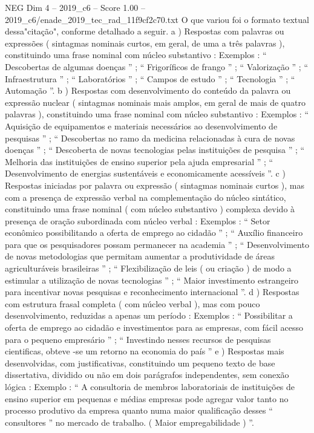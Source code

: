 \begin{textsample}{NEG Dim 4 – 2019\_c6 – Score 1.00 – 2019\_c6/enade\_2019\_tec\_rad\_11f9cf2c70.txt}
O que variou foi o formato textual dessa"citação", conforme detalhado a seguir. a ) Respostas com palavras ou expressões ( sintagmas nominais curtos, em geral, de uma a três palavras ), constituindo uma frase nominal com núcleo substantivo : Exemplos : “ Descobertas de algumas doenças ” ; “ Frigoríficos de frango ” ; “ Valorização ” ; “ Infraestrutura ” ; “ Laboratórios ” ; “ Campos de estudo ” ; “ Tecnologia ” ; “ Automação ”. b ) Respostas com desenvolvimento do conteúdo da palavra ou expressão nuclear ( sintagmas nominais mais amplos, em geral de mais de quatro palavras ), constituindo uma frase nominal com núcleo substantivo : Exemplos : “ Aquisição de equipamentos e materiais necessários ao desenvolvimento de pesquisas ” ; “ Descobertas no ramo da medicina relacionadas à cura de novas doenças ” ; “ Descoberta de novas tecnologias pelas instituições de pesquisa ” ; “ Melhoria das instituições de ensino superior pela ajuda empresarial ” ; “ Desenvolvimento de energias sustentáveis e economicamente acessíveis ”. c ) Respostas iniciadas por palavra ou expressão ( sintagmas nominais curtos ), mas com a presença de expressão verbal na complementação do núcleo sintático, constituindo uma frase nominal ( com núcleo substantivo ) complexa devido à presença de oração subordinada com núcleo verbal : Exemplos : “ Setor econômico possibilitando a oferta de emprego ao cidadão ” ; “ Auxílio financeiro para que os pesquisadores possam permanecer na academia ” ; “ Desenvolvimento de novas metodologias que permitam aumentar a produtividade de áreas agriculturáveis brasileiras ” ; “ Flexibilização de leis ( ou criação ) de modo a estimular a utilização de novas tecnologias ” ; “ Maior investimento estrangeiro para incentivar novas pesquisas e reconhecimento internacional ”. d ) Respostas com estrutura frasal completa ( com núcleo verbal ), mas com pouco desenvolvimento, reduzidas a apenas um período : Exemplos : “ Possibilitar a oferta de emprego ao cidadão e investimentos para as empresas, com fácil acesso para o pequeno empresário ” ; “ Investindo nesses recursos de pesquisas cientificas, obteve -se um retorno na economia do país ” e ) Respostas mais desenvolvidas, com justificativas, constituindo um pequeno texto de base dissertativa, dividido ou não em dois parágrafos independentes, sem conexão lógica : Exemplo : “ A consultoria de membros laboratoriais de instituições de ensino superior em pequenas e médias empresas pode agregar valor tanto no processo produtivo da empresa quanto numa maior qualificação desses “ consultores ” no mercado de trabalho. ( Maior empregabilidade ) ”.

\end{textsample}
